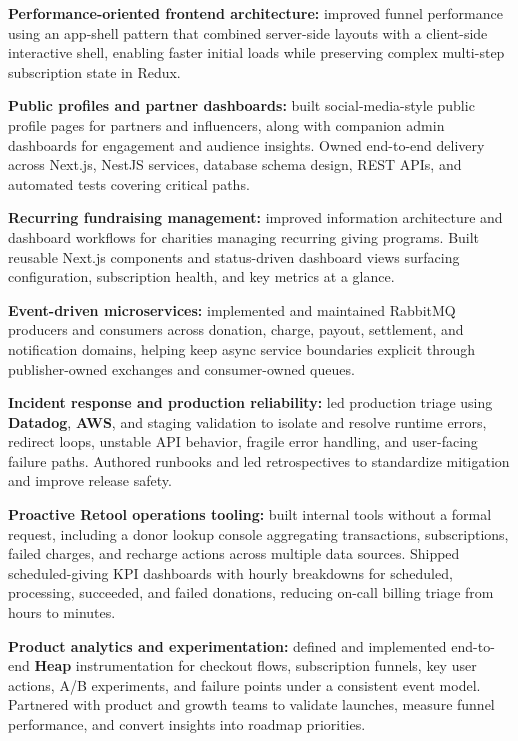\documentclass[letterpaper,11pt]{article}
\newcommand{\resumeItem}[1]{\item\small{{#1 \vspace{-2pt}}}}
\begin{document}
  \resumeItem{\textbf{Performance-oriented frontend architecture:} improved funnel performance using an app-shell pattern that combined server-side layouts with a client-side interactive shell, enabling faster initial loads while preserving complex multi-step subscription state in Redux.}

  \resumeItem{\textbf{Public profiles and partner dashboards:} built social-media-style public profile pages for partners and influencers, along with companion admin dashboards for engagement and audience insights. Owned end-to-end delivery across Next.js, NestJS services, database schema design, REST APIs, and automated tests covering critical paths.}

  \resumeItem{\textbf{Recurring fundraising management:} improved information architecture and dashboard workflows for charities managing recurring giving programs. Built reusable Next.js components and status-driven dashboard views surfacing configuration, subscription health, and key metrics at a glance.}

  \resumeItem{\textbf{Event-driven microservices:} implemented and maintained RabbitMQ producers and consumers across donation, charge, payout, settlement, and notification domains, helping keep async service boundaries explicit through publisher-owned exchanges and consumer-owned queues.}

  \resumeItem{\textbf{Incident response and production reliability:} led production triage using \textbf{Datadog}, \textbf{AWS}, and staging validation to isolate and resolve runtime errors, redirect loops, unstable API behavior, fragile error handling, and user-facing failure paths. Authored runbooks and led retrospectives to standardize mitigation and improve release safety.}

  \resumeItem{\textbf{Proactive Retool operations tooling:} built internal tools without a formal request, including a donor lookup console aggregating transactions, subscriptions, failed charges, and recharge actions across multiple data sources. Shipped scheduled-giving KPI dashboards with hourly breakdowns for scheduled, processing, succeeded, and failed donations, reducing on-call billing triage from hours to minutes.}

  \resumeItem{\textbf{Product analytics and experimentation:} defined and implemented end-to-end \textbf{Heap} instrumentation for checkout flows, subscription funnels, key user actions, A/B experiments, and failure points under a consistent event model. Partnered with product and growth teams to validate launches, measure funnel performance, and convert insights into roadmap priorities.}
\end{document}
